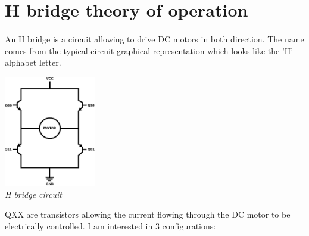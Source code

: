 \documentclass[12pt]{article}
\begin{document}
\newpage
\section{H bridge theory of operation}
\paragraph{} An H bridge is a circuit allowing to drive DC motors in both direction. The name comes from the
typical circuit graphical representation which looks like the 'H' alphabet letter.

\begin{center}
  \includegraphics[keepaspectratio=true, width=40mm]{../pics/hbridge_base.jpg}
  \\
  \smallskip
  \tiny{\textit{H bridge circuit}}
\end{center}

QXX are transistors allowing the current flowing through the DC motor to be electrically controlled. I am
interested in 3 configurations:
\end{document}
